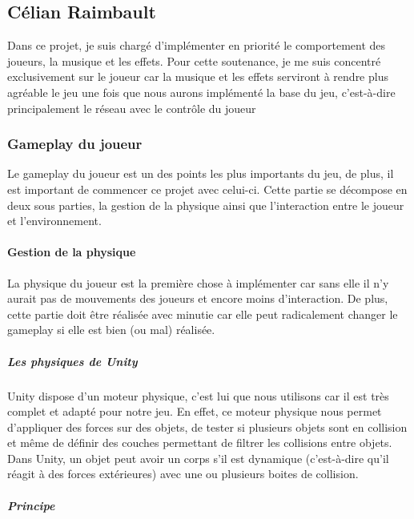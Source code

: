 \documentclass{article}
\begin{document}
\newpage
\subsection{Célian Raimbault}

Dans ce projet, je suis chargé d'implémenter en priorité le comportement des joueurs, la musique et les effets. Pour cette soutenance, je me suis concentré exclusivement sur le joueur car la musique et les effets serviront à rendre plus agréable le jeu une fois que nous aurons implémenté la base du jeu, c'est-à-dire principalement le réseau avec le contrôle du joueur

\subsubsection{Gameplay du joueur}

Le gameplay du joueur est un des points les plus importants du jeu, de plus, il est important de commencer ce projet avec celui-ci. Cette partie se décompose en deux sous parties, la gestion de la physique ainsi que l'interaction entre le joueur et l'environnement.

\paragraph{Gestion de la physique}

La physique du joueur est la première chose à implémenter car sans elle il n'y aurait pas de mouvements des joueurs et encore moins d'interaction.
De plus, cette partie doit être réalisée avec minutie car elle peut radicalement changer le gameplay si elle est bien (ou mal) réalisée.

\subparagraph{Les physiques de Unity}

Unity dispose d'un moteur physique, c'est lui que nous utilisons car il est très complet et adapté pour notre jeu. En effet, ce moteur physique nous permet d'appliquer des forces sur des objets, de tester si plusieurs objets sont en collision et même de définir des couches permettant de filtrer les collisions entre objets. Dans Unity, un objet peut avoir un corps s'il est dynamique (c'est-à-dire qu'il réagit à des forces extérieures) avec une ou plusieurs boites de collision.

\subparagraph{Principe}
\end{document}
